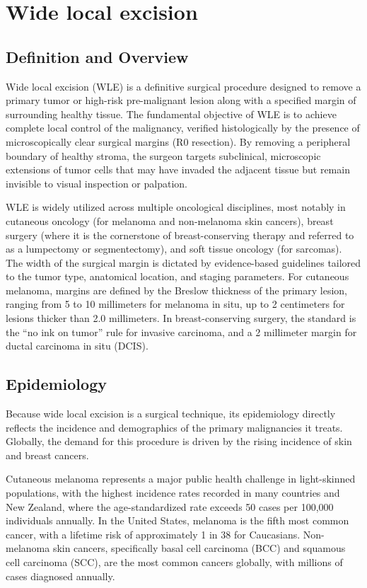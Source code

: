 \chapter{Wide local excision}

\section*{Definition and Overview}
Wide local excision (WLE) is a definitive surgical procedure designed to remove a primary tumor or high-risk pre-malignant lesion along with a specified margin of surrounding healthy tissue. The fundamental objective of WLE is to achieve complete local control of the malignancy, verified histologically by the presence of microscopically clear surgical margins (R0 resection). By removing a peripheral boundary of healthy stroma, the surgeon targets subclinical, microscopic extensions of tumor cells that may have invaded the adjacent tissue but remain invisible to visual inspection or palpation.

WLE is widely utilized across multiple oncological disciplines, most notably in cutaneous oncology (for melanoma and non-melanoma skin cancers), breast surgery (where it is the cornerstone of breast-conserving therapy and referred to as a lumpectomy or segmentectomy), and soft tissue oncology (for sarcomas). The width of the surgical margin is dictated by evidence-based guidelines tailored to the tumor type, anatomical location, and staging parameters. For cutaneous melanoma, margins are defined by the Breslow thickness of the primary lesion, ranging from 5 to 10 millimeters for melanoma in situ, up to 2 centimeters for lesions thicker than 2.0 millimeters. In breast-conserving surgery, the standard is the ``no ink on tumor'' rule for invasive carcinoma, and a 2 millimeter margin for ductal carcinoma in situ (DCIS).

\section*{Epidemiology}
Because wide local excision is a surgical technique, its epidemiology directly reflects the incidence and demographics of the primary malignancies it treats. Globally, the demand for this procedure is driven by the rising incidence of skin and breast cancers.

Cutaneous melanoma represents a major public health challenge in light-skinned populations, with the highest incidence rates recorded in many countries and New Zealand, where the age-standardized rate exceeds 50 cases per 100,000 individuals annually. In the United States, melanoma is the fifth most common cancer, with a lifetime risk of approximately 1 in 38 for Caucasians. Non-melanoma skin cancers, specifically basal cell carcinoma (BCC) and squamous cell carcinoma (SCC), are the most common cancers globally, with millions of cases diagnosed annually.

